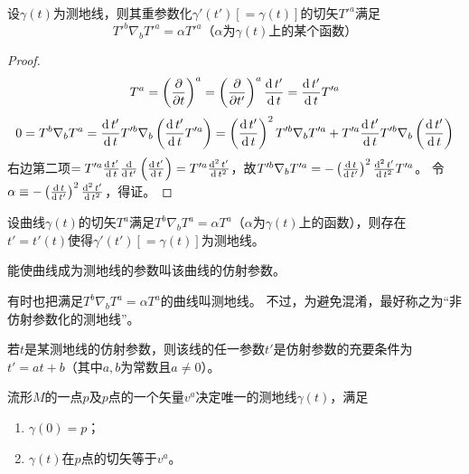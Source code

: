 \begin{theorem}
设$\gamma(t)$为测地线，则其重参数化$\gamma'(t')[= \gamma(t)]$的切矢$T'^a$满足
$$T'^b\nabla_bT'^a = \alpha T'^a\text{（$\alpha$为$\gamma(t)$上的某个函数）}$$
\end{theorem}

\begin{proof}
$$T^a = \left(\frac{\partial}{\partial t}\right)^a = \left(\frac{\partial}{\partial t'}\right)^a\frac{\operatorname{d} t'}{\operatorname{d} t} = \frac{\operatorname{d} t'}{\operatorname{d} t}T'^a$$
$$0 = T^b\nabla_bT^a = \frac{\operatorname{d} t'}{\operatorname{d} t}T'^b\nabla_b\left(\frac{\operatorname{d} t'}{\operatorname{d} t}T'^a\right) = \left(\frac{\operatorname{d} t'}{\operatorname{d} t}\right)^2T'^b\nabla_bT'^a + T'^a\frac{\operatorname{d} t'}{\operatorname{d} t}T'^b\nabla_b\left(\frac{\operatorname{d} t'}{\operatorname{d} t}\right)$$
右边第二项$= T'^a\frac{\operatorname{d} t'}{\operatorname{d} t}\frac{\operatorname{d}}{\operatorname{d} t'}\left(\frac{\operatorname{d} t'}{\operatorname{d} t}\right) = T'^a\frac{\operatorname{d}^2t'}{\operatorname{d} t^2}$，故$T'^b\nabla_bT'^a = -\left(\frac{\operatorname{d} t}{\operatorname{d} t'}\right)^2\frac{\operatorname{d}^2t'}{\operatorname{d} t^2}T'^a$。
令$\alpha \equiv -\left(\frac{\operatorname{d} t}{\operatorname{d} t'}\right)^2\frac{\operatorname{d}^2t'}{\operatorname{d} t^2}$，得证。
\end{proof}

\begin{theorem}
设曲线$\gamma(t)$的切矢$T^a$满足$T^b\nabla_bT^a = \alpha T^a$（$\alpha$为$\gamma(t)$上的函数），则存在$t' = t'(t)$使得$\gamma'(t')[= \gamma(t)]$为测地线。
\end{theorem}

\begin{definition}
能使曲线成为测地线的参数叫该曲线的仿射参数。
\end{definition}

\begin{note}
有时也把满足$T^b\nabla_bT^a = \alpha T^a$的曲线叫测地线。
不过，为避免混淆，最好称之为``非仿射参数化的测地线''。
\end{note}

\begin{theorem}
若$t$是某测地线的仿射参数，则该线的任一参数$t'$是仿射参数的充要条件为$t' = at +b$（其中$a, b$为常数且$a \neq 0$）。
\end{theorem}

\begin{theorem}
流形$M$的一点$p$及$p$点的一个矢量$v^a$决定唯一的测地线$\gamma(t)$，满足
\begin{enumerate}[（1）]
\item $\gamma(0) = p$；
\item $\gamma(t)$在$p$点的切矢等于$v^a$。
\end{enumerate}
\end{theorem}


